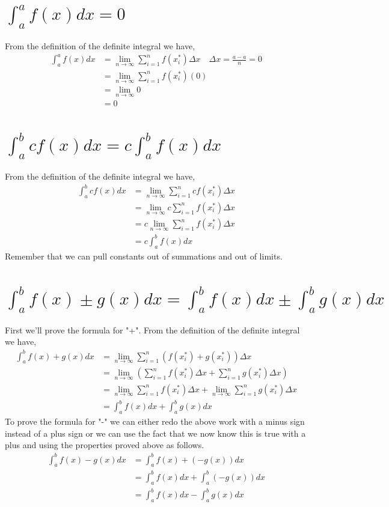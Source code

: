 \documentclass[10pt]{article}
\begin{document}
\section{$\int_{a}^{a} f(x) d x=0$}
From the definition of the definite integral we have,
$$
\begin{aligned}
\int_{a}^{a} f(x) d x &=\lim _{n \rightarrow \infty} \sum_{i=1}^{n} f\left(x_{i}^{*}\right) \Delta x \quad \Delta x=\frac{a-a}{n}=0 \\
&=\lim _{n \rightarrow \infty} \sum_{i=1}^{n} f\left(x_{i}^{*}\right)(0) \\
&=\lim _{n \rightarrow \infty} 0 \\
&=0
\end{aligned}
$$

\section{$\int_{a}^{b} c f(x) d x=c \int_{a}^{b} f(x) d x$}
From the definition of the definite integral we have,
$$
\begin{aligned}
\int_{a}^{b} c f(x) d x &=\lim _{n \rightarrow \infty} \sum_{i=1}^{n} c f\left(x_{i}^{*}\right) \Delta x \\
&=\lim _{n \rightarrow \infty} c \sum_{i=1}^{n} f\left(x_{i}^{*}\right) \Delta x \\
&=c \lim _{n \rightarrow \infty} \sum_{i=1}^{n} f\left(x_{i}^{*}\right) \Delta x \\
&=c \int_{a}^{b} f(x) d x
\end{aligned}
$$
Remember that we can pull constants out of summations and out of limits.

\section{$\int_{a}^{b} f(x) \pm g(x) d x=\int_{a}^{b} f(x) d x \pm \int_{a}^{b} g(x) d x$}
First we'll prove the formula for "+". From the definition of the definite integral we have,
$$
\begin{aligned}
\int_{a}^{b} f(x)+g(x) d x &=\lim _{n \rightarrow \infty} \sum_{i=1}^{n}\left(f\left(x_{i}^{*}\right)+g\left(x_{i}^{*}\right)\right) \Delta x \\
&=\lim _{n \rightarrow \infty}\left(\sum_{i=1}^{n} f\left(x_{i}^{*}\right) \Delta x+\sum_{i=1}^{n} g\left(x_{i}^{*}\right) \Delta x\right) \\
&=\lim _{n \rightarrow \infty} \sum_{i=1}^{n} f\left(x_{i}^{*}\right) \Delta x+\lim _{n \rightarrow \infty} \sum_{i=1}^{n} g\left(x_{i}^{*}\right) \Delta x \\
&=\int_{a}^{b} f(x) d x+\int_{a}^{b} g(x) d x
\end{aligned}
$$
To prove the formula for "-" we can either redo the above work with a minus sign instead of a plus sign or we can use the fact that we now know this is true with a plus and using the properties proved above as follows.
$$
\begin{aligned}
\int_{a}^{b} f(x)-g(x) d x &=\int_{a}^{b} f(x)+(-g(x)) d x \\
&=\int_{a}^{b} f(x) d x+\int_{a}^{b}(-g(x)) d x \\
&=\int_{a}^{b} f(x) d x-\int_{a}^{b} g(x) d x
\end{aligned}
$$
\end{document}
